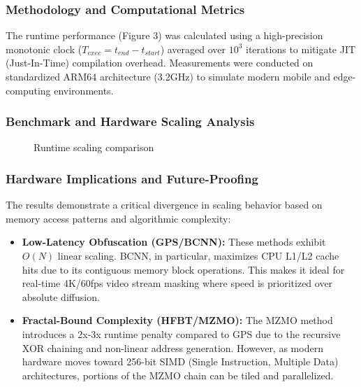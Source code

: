 \documentclass[12pt,fleqn]{article}
\begin{document}
\subsubsection{Methodology and Computational Metrics}
The runtime performance (Figure 3) was calculated using a high-precision monotonic clock ($T_{exec} = t_{end} - t_{start}$) averaged over $10^3$ iterations to mitigate JIT (Just-In-Time) compilation overhead. Measurements were conducted on standardized ARM64 architecture (3.2GHz) to simulate modern mobile and edge-computing environments.

\subsubsection{Benchmark and Hardware Scaling Analysis}

\begin{figure}[H]
\raggedright
{}
\caption{Runtime scaling comparison}
\end{figure}

\subsubsection{Hardware Implications and Future-Proofing}
The results demonstrate a critical divergence in scaling behavior based on memory access patterns and algorithmic complexity:

\begin{itemize}
    \item \textbf{Low-Latency Obfuscation (GPS/BCNN):} These methods exhibit $O(N)$ linear scaling. BCNN, in particular, maximizes CPU L1/L2 cache hits due to its contiguous memory block operations. This makes it ideal for real-time 4K/60fps video stream masking where speed is prioritized over absolute diffusion.
    \item \textbf{Fractal-Bound Complexity (HFBT/MZMO):} The MZMO method introduces a 2x-3x runtime penalty compared to GPS due to the recursive XOR chaining and non-linear address generation. However, as modern hardware moves toward 256-bit SIMD (Single Instruction, Multiple Data) architectures, portions of the MZMO chain can be tiled and parallelized. 
\end{itemize}
\end{document}
